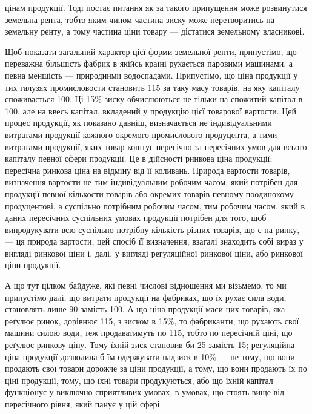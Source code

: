 \parcont{}  %
цінам продукції. Тоді постає питання як за такого припущення може розвинутися
земельна рента, тобто яким чином частина зиску може перетворитись на земельну
ренту, а тому частина ціни товару — дістатися земельному власникові.

Щоб показати загальний характер цієї форми земельної ренти, припустімо,
що переважна більшість фабрик в якійсь країні рухається паровими машинами,
а певна меншість — природними водоспадами. Припустімо, що ціна продукції
у тих галузях промисловости становить 115 за таку масу товарів, на яку капіталу
споживається 100. Ці 15\% зиску обчислюються не тільки на спожитий капітал
в 100, але на ввесь капітал, вкладений у продукцію цієї товарової вартости.
Цей процес продукції, як показано давніш, визначається не індивідуальними
витратами продукції кожного окремого промислового продуцента, а тими витратами
продукції, яких товар коштує пересічно за пересічних умов для всього капіталу
певної сфери продукції. Це в дійсності ринкова ціна продукції; пересічна ринкова
ціна на відміну від її коливань. Природа вартости товарів, визначення вартости
не тим індивідуальним робочим часом, який потрібен для продукції певної
кількости товарів або окремих товарів певному поодинокому продуцентові, а
суспільно потрібним робочим часом, тим робочим часом, який в даних пересічних
суспільних умовах продукції потрібен для того, щоб випродукувати всю суспільно-потрібну
кількість різних товарів, що є на ринку, — ця природа вартости,
цей спосіб її визначення, взагалі знаходить собі вираз у вигляді ринкової ціни
і, далі, у вигляді регуляційної ринкової ціни, або ринкової ціни продукції.

А що тут цілком байдуже, які певні числові відношення ми візьмемо, то ми
припустімо далі, що витрати продукції на фабриках, що їх рухає сила води,
становлять лише 90 замість 100. А що ціна продукції маси цих товарів, яка
реґулює ринок, дорівнює 115, з зиском в 15\%, то фабриканти, що рухають
свої машини силою води, теж продаватимуть по 115, тобто по пересічній ціні,
що реґулює ринкову ціну. Тому їхній зиск становив би 25 замість 15; регуляційна
ціна продукції дозволила б їм одержувати надзиск в 10\% — не тому, що вони
продають свої товари дорожче за ціни продукції, а тому, що вони продають
їх по ціні продукції, тому, що їхні товари продукуються, або що їхній капітал
функціонує у виключно сприятливих умовах, в умовах, що стоять вище від пересічного
рівня, який панує у цій сфері.

